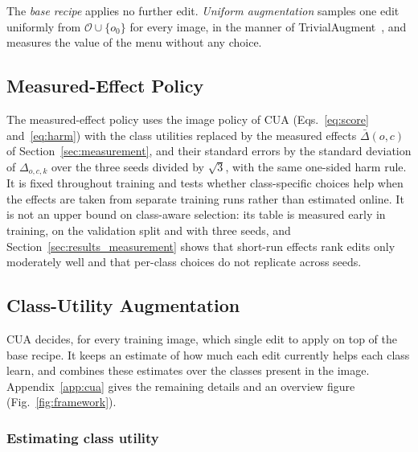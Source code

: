 \documentclass[conference]{IEEEtran}
\begin{document}
The \emph{base recipe} applies no further edit. \emph{Uniform augmentation} samples one edit uniformly from $\mathcal{O}\cup\{o_0\}$ for every image, in the manner of TrivialAugment~\cite{muller2021trivial}, and measures the value of the menu without any choice.

\subsection{Measured-Effect Policy}
\label{sec:method_measured}

The measured-effect policy uses the image policy of CUA (Eqs.~\eqref{eq:score} and~\eqref{eq:harm}) with the class utilities replaced by the measured effects $\bar\Delta(o,c)$ of Section~\ref{sec:measurement}, and their standard errors by the standard deviation of $\Delta_{o,c,k}$ over the three seeds divided by $\sqrt{3}$, with the same one-sided harm rule. It is fixed throughout training and tests whether class-specific choices help when the effects are taken from separate training runs rather than estimated online. It is not an upper bound on class-aware selection: its table is measured early in training, on the validation split and with three seeds, and Section~\ref{sec:results_measurement} shows that short-run effects rank edits only moderately well and that per-class choices do not replicate across seeds.

\subsection{Class-Utility Augmentation}
\label{sec:method}

CUA decides, for every training image, which single edit to apply on top of the base recipe. It keeps an estimate of how much each edit currently helps each class learn, and combines these estimates over the classes present in the image. Appendix~\ref{app:cua} gives the remaining details and an overview figure (Fig.~\ref{fig:framework}).

\subsubsection{Estimating class utility}
\label{sec:method_estimator}
\end{document}
